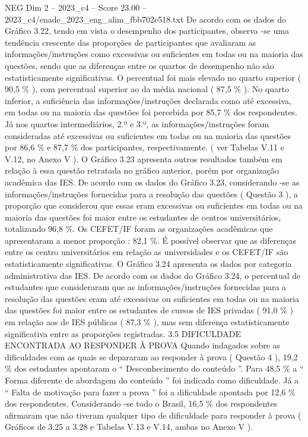 \begin{textsample}{NEG Dim 2 – 2023\_c4 – Score 23.00 – 2023\_c4/enade\_2023\_eng\_alim\_fbb702e518.txt}
De acordo com os dados do Gráfico 3.22, tendo em vista o desempenho dos participantes, observa -se uma tendência crescente das proporções de participantes que avaliaram as informações/instruções como excessivas ou suficientes em todas ou na maioria das questões, sendo que as diferenças entre os quartos de desempenho não são estatisticamente significativas.
O percentual foi mais elevado no quarto superior ( 90,5 \% ), com percentual superior ao da média nacional ( 87,5 \% ).
No quarto inferior, a suficiência das informações/instruções declarada como até excessiva, em todas ou na maioria das questões foi percebida por 85,7 \% dos respondentes.
Já nos quartos intermediários, 2.º e 3.º, as informações/instruções foram consideradas até excessivas ou suficientes em todas ou na maioria das questões por 86,6 \% e 87,7 \% dos participantes, respectivamente. ( ver Tabelas V.11 e V.12, no Anexo V ).
O Gráfico 3.23 apresenta outros resultados também em relação à essa questão retratada no gráfico anterior, porém por organização acadêmica das IES.
De acordo com os dados do Gráfico 3.23, considerando -se as informações/instruções fornecidas para a resolução das questões ( Questão 3 ), a proporção que considerou que essas eram excessivas ou suficientes em todas ou na maioria das questões foi maior entre os estudantes de centros universitários, totalizando 96,8 \%.
Os CEFET/IF foram as organizações acadêmicas que apresentaram a menor proporção : 82,1 \%.
É possível observar que as diferenças entre os centro universitários em relação as universidades e os CEFET/IF são estatisticamente significativas.
O Gráfico 3.24 apresenta os dados por categoria administrativa das IES.
De acordo com os dados do Gráfico 3.24, o percentual de estudantes que consideraram que as informações/instruções fornecidas para a resolução das questões eram até excessivas ou suficientes em todas ou na maioria das questões foi maior entre os estudantes de cursos de IES privadas ( 91,0 \% ) em relação aos de IES públicas ( 87,3 \% ), mas sem diferença estatisticamente significativa entre as proporções registradas. 3.5 DIFICULDADE ENCONTRADA AO RESPONDER À PROVA Quando indagados sobre as dificuldades com as quais se depararam ao responder à prova ( Questão 4 ), 19,2 \% dos estudantes apontaram o “ Desconhecimento do conteúdo ”.
Para 48,5 \% a “ Forma diferente de abordagem do conteúdo ” foi indicada como dificuldade.
Já a “ Falta de motivação para fazer a prova ” foi a dificuldade apontada por 12,6 \% dos respondentes.
Considerando -se todo o Brasil, 16,5 \% dos respondentes afirmaram que não tiveram qualquer tipo de dificuldade para responder à prova ( Gráficos de 3.25 a 3.28 e Tabelas V.13 e V.14, ambas no Anexo V ).

\end{textsample}
